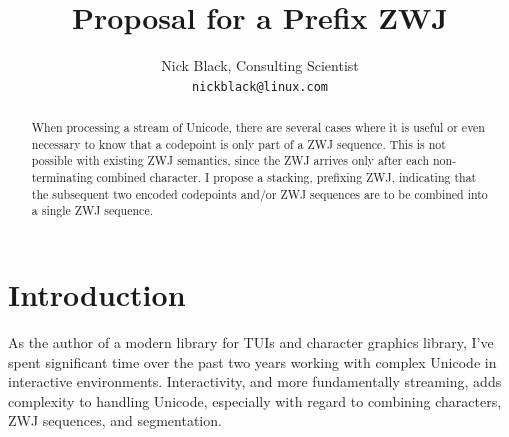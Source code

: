 \documentclass[letterpaper,10pt]{article}
\title{Proposal for a Prefix ZWJ}
\author{Nick Black, Consulting Scientist\\
\texttt{nickblack@linux.com}
}
\begin{document}
%
\maketitle
\date{}
\vspace{1in}
\begin{abstract}
When processing a stream of Unicode, there are several cases where it
is useful or even necessary to know that a codepoint is only part of a
ZWJ sequence. This is not possible with existing ZWJ semantics, since
the ZWJ arrives only after each non-terminating combined character. I
propose a stacking, prefixing ZWJ, indicating that the subsequent two
encoded codepoints and/or ZWJ sequences are to be combined into a single
ZWJ sequence.
\end{abstract}
\thispagestyle{empty}

\section{Introduction}
As the author of a modern library for TUIs and character graphics\cite{notcurses}
library, I've spent significant time over the past two years working with
complex Unicode in interactive environments. Interactivity, and more
fundamentally streaming, adds complexity to handling Unicode, especially
with regard to combining characters, ZWJ sequences\cite{zwjseqs}, and
segmentation\cite{segmentation}.

\end{document}
